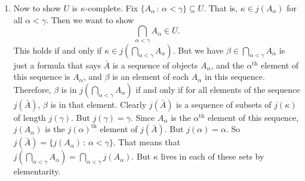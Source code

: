 \documentclass{article}
\begin{document}
\begin{enumerate}
\begin{enumerate}
        \item Now to show $U$ is $\kappa$-complete. Fix $\{A_{\alpha} \, : \, \alpha<\gamma\} \subseteq U$. That is, $\kappa \in j(A_{\alpha})$ for all $\alpha < \gamma$. Then we want to show \[ \bigcap_{\alpha<\gamma} A_{\alpha} \in U.\]
        This holds if and only if $\kappa \in j(\bigcap_{\alpha<\gamma} A_{\alpha})$. But we have $\beta \in \bigcap_{\alpha < \gamma} A_{\alpha}$ is just a formula that says $\bar{A}$ is a sequence of objects $A_{\alpha}$, and the $\alpha^{\text{th}}$ element of this sequence is $A_{\alpha}$, and $\beta$ is an element of each $A_{\alpha}$ in this sequence. Therefore, $\beta$ is in $j(\bigcap_{\alpha<\gamma} A_{\alpha})$ if and only if for all elements of the sequence $j(\bar{A})$, $\beta$ is in that element. Clearly $j(\bar{A})$ is a sequence of subsets of $j(\kappa)$ of length $j(\gamma)$. But $j(\gamma) = \gamma$. Since $A_{\alpha}$ is the $\alpha^{\text{th}}$ element of this sequence, $j(A_{\alpha})$ is the $j(\alpha)^{\text{th}}$ element of $j(\bar{A})$. But $j(\alpha)=\alpha$. So $j(\bar{A})=\{j(A_{\alpha}) \, : \, \alpha < \gamma\}$. That means that $j(\bigcap_{\alpha< \gamma} A_{\alpha}) = \bigcap_{\alpha < \gamma} j(A_{\alpha})$. But $\kappa$ lives in each of these sets by elementarity.
    \end{enumerate} 
\end{enumerate}
\endproof 
\end{document}
